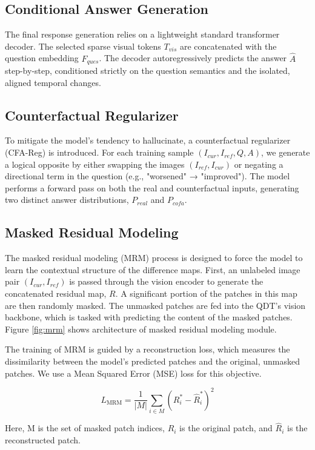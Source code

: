 \subsection{Conditional Answer Generation}
The final response generation relies on a lightweight standard transformer decoder. The selected sparse visual tokens $T_{vis}$ are concatenated with the question embedding $F_{ques}$. The decoder autoregressively predicts the answer $\hat{A}$ step-by-step, conditioned strictly on the question semantics and the isolated, aligned temporal changes.

\subsection{Counterfactual Regularizer}
To mitigate the model's tendency to hallucinate, a counterfactual regularizer (CFA-Reg) is introduced. For each training sample $(I_{cur},I_{ref}, Q, A)$, we generate a logical opposite by either swapping the images $(I_{ref},I_{cur})$ or negating a directional term in the question (e.g., "worsened" → "improved"). The model performs a forward pass on both the real and counterfactual inputs, generating two distinct answer distributions, $P_{real}$ and $P_{cofa}$.


\subsection{Masked Residual Modeling}
The masked residual modeling (MRM) process is designed to force the model to learn the contextual structure of the difference maps. First, an unlabeled image pair $(I_{cur}, I_{ref})$ is passed through the vision encoder to generate the concatenated residual map, $R$. A significant portion of the patches in this map are then randomly masked. The unmasked patches are fed into the QDT's vision backbone, which is tasked with predicting the content of the masked patches. Figure \ref{fig:mrm} shows architecture of masked residual modeling module. 


The training of MRM is guided by a reconstruction loss, which measures the dissimilarity between the model's predicted patches and the original, unmasked patches. We use a Mean Squared Error (MSE) loss for this objective.

$$
L_{\text{MRM}} = \frac{1}{|M|} \sum_{i \in M} (R_{i}^{*} - \hat{R}_{i}^{*})^{2}
$$

Here, M is the set of masked patch indices, $R_i$ is the original patch, and 
$\hat{R}_i$ is the reconstructed patch.
 
